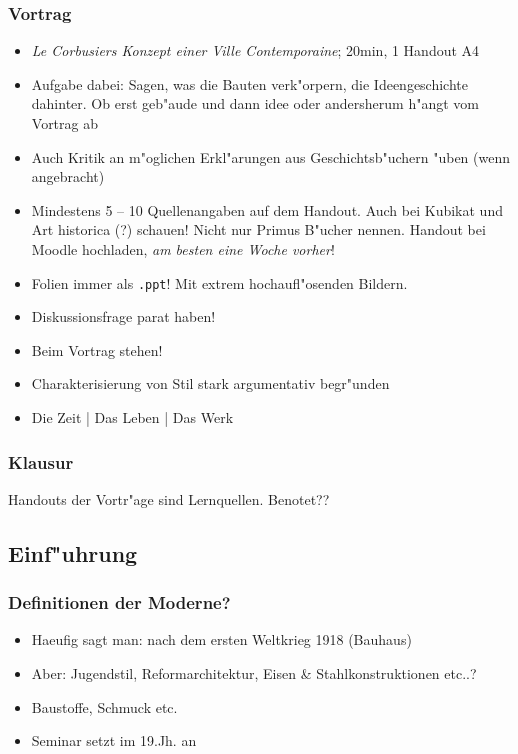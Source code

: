 \documentclass[emulatestandardclasses]{scrartcl}
\begin{document}
\subsubsection{Vortrag}

\begin{itemize}
    \item \emph{Le Corbusiers Konzept einer Ville Contemporaine}; 20min, 1 Handout A4
    \item Aufgabe dabei: Sagen, was die Bauten verk"orpern, die Ideengeschichte dahinter. Ob erst geb"aude und dann idee oder andersherum h"angt vom Vortrag ab
    \item Auch Kritik an m"oglichen Erkl"arungen aus Geschichtsb"uchern "uben (wenn angebracht)
    \item Mindestens 5 -- 10 Quellenangaben auf dem Handout. Auch bei Kubikat und Art historica (?) schauen! Nicht nur Primus B"ucher nennen. Handout bei Moodle hochladen, \emph{am besten eine Woche vorher}! 
    \item Folien immer als \texttt{.ppt}! Mit extrem hochaufl"osenden Bildern.
    \item Diskussionsfrage parat haben!
    \item Beim Vortrag stehen!
    \item Charakterisierung von Stil stark argumentativ begr"unden
    \item Die Zeit | Das Leben | Das Werk
\end{itemize}



\subsubsection{Klausur}
Handouts der Vortr"age sind Lernquellen.
Benotet??

\subsection{Einf"uhrung}
\subsubsection{Definitionen der Moderne?}
\begin{itemize}
    \item Haeufig sagt man: nach dem ersten Weltkrieg 1918 (Bauhaus)
    \item Aber: Jugendstil, Reformarchitektur, Eisen \& Stahlkonstruktionen etc..?
    \item Baustoffe, Schmuck etc.
    \item Seminar setzt im 19.Jh. an
\end{itemize}
\end{document}
